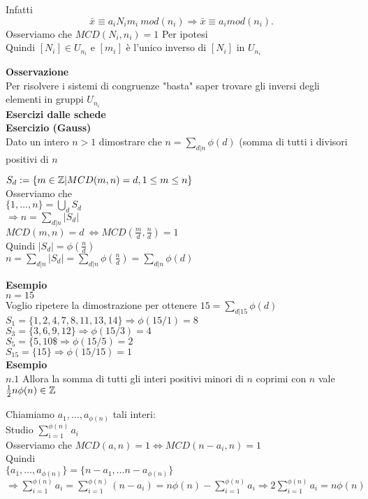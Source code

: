 \documentclass[12px]{article}
\begin{document}
{\begin{dimo}
		Infatti  \[
		\bar x\equiv a_iN_im_i \ mod(n_i) \Rightarrow \bar x\equiv a_i mod(n_i)
		.\] 
		Osserviamo che $MCD(N_i,n_i) = 1$ Per ipotesi\\
		Quindi $[N_i]\in U_{n_i}$ e  $[m_i]$ è l'unico inverso di $[N_i]$ in  $U_{n_i}$
	\end{dimo}
	\textbf{Osservazione}\\
	Per risolvere i sistemi di congruenze "basta" saper trovare gli inversi degli elementi in gruppi $U_{n_i}$\\
	 \textbf{Esercizi dalle schede}\\
	 \textbf{Esercizio (Gauss)}\\
	 Dato un intero $n > 1$ dimostrare che  $n = \sum_{d | n} \phi (d)$ (somma di tutti i divisori positivi di $n$
\begin{dimo}
	$S_d : = \{m\in \mathbb{Z} | MCD(m,n) = d, 1 \leq m\leq n\}$\\
	Osserviamo che \\
	$\{1,\ldots,n\} = \bigcup_dS_d$\\
	 $ \Rightarrow  n= \sum_{d | n} | S_d|$\\
 $MCD(m,n) = d \ \Leftrightarrow MCD(\frac md, \frac nd) = 1$\\
 Quindi $|S_d| = \phi(\frac nd)$\\
 $n = \sum_{d|n}|S_d| = \sum_{d|n}\phi(\frac nd) = \sum_{d|n}\phi(d)$\\
\end{dimo}
 \textbf{Esempio}\\
 $n = 15$\\
 Voglio ripetere la dimostrazione per ottenere  $15 = \sum_{d|15}\phi(d)$\\
 $S_1 = \{1,2, 4, 7, 8, 11, 13 , 14\} \Rightarrow \phi(15/1) = 8$\\
 $S_3 = \{3, 6, 9, 12\} \Rightarrow \phi(15/3) = 4$\\
 $S_5 = \{5, 10\$ \Rightarrow \phi(15/5) = 2$\\
	 $S_{15} = \{15\} \Rightarrow \phi ( 15/15) = 1$\\
\textbf{Esempio}\\
$n.1$ Allora la somma di tutti gli interi positivi minori di $n$ coprimi con $n$ vale $\frac 12n\phi(n)\in \mathbb{Z}$
\begin{dimo}
	Chiamiamo $a_1,\ldots, a_{\phi(n)}$ tali interi:\\
	Studio $\sum_{i=1}^{\phi(n)}a_i$\\
	Osserviamo che  $MCD(a,n)=1 \Leftrightarrow MCD(n-a_i, n) = 1$ \\
	Quindi\\
	$\{a_1,\ldots, a_{\phi(n)}\} = \{n - a_1,\ldots n - a_{\phi(n)}\}$\\
	$ \Rightarrow \sum^{\phi(n)}_{i=1}a_i = \sum^{\phi(n)}_{i=1}(n-a_i) = n\phi(n) - \sum^{\phi(n)}_{i=1}a_i \Rightarrow 2 \sum^{\phi(n)}_{i=1}a_i = n \phi(n)$
\end{dimo}
}
\end{document}

